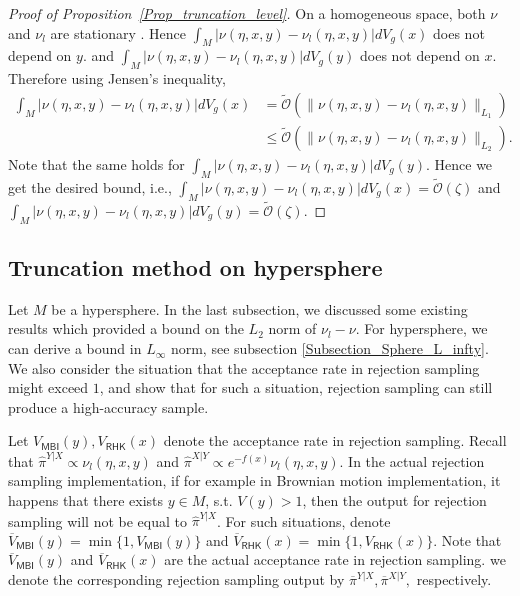 \begin{proof}[Proof of Proposition~\ref{Prop_truncation_level}]
    On a homogeneous space, both $\nu$ and $\nu_{l}$ are stationary \citep{azangulov2022stationary}.
    Hence $\int_{M} |\nu(\eta, x, y) - \nu_{l}(\eta, x, y) | dV_{g}(x) $ does not depend on $y$.
    and $\int_{M} |\nu(\eta, x, y) - \nu_{l}(\eta, x, y) | dV_{g}(y)$ does not depend on $x$.
    Therefore using Jensen's inequality, 
    \begin{align*}
        \int_{M} |\nu(\eta, x, y) - \nu_{l}(\eta, x, y) | dV_{g}(x) 
           & = \tilde{\mathcal{O}} (\|\nu(\eta, x, y) - \nu_{l}(\eta, x, y)\|_{L_{1}})\\
            &\le \tilde{\mathcal{O}} (\|\nu(\eta, x, y) - \nu_{l}(\eta, x, y)\|_{L_{2}}).
    \end{align*}
    Note that the same holds for $\int_{M} |\nu(\eta, x, y) - \nu_{l}(\eta, x, y) | dV_{g}(y)$.
    Hence we get the desired bound, i.e., 
    $\int_{M} |\nu(\eta, x, y) - \nu_{l}(\eta, x, y)| dV_{g}(x) = \tilde{\mathcal{O}}(\zeta)$ 
    and $\int_{M} |\nu(\eta, x, y) - \nu_{l}(\eta, x, y)| dV_{g}(y) = \tilde{\mathcal{O}}(\zeta)$.
\end{proof}

\subsection{Truncation method on hypersphere}\label{Subsection_inexact_rej}

Let $M$ be a hypersphere. 
In the last subsection, we discussed some existing results which provided a bound on the $L_{2}$ norm of $\nu_{l} - \nu$. For hypersphere, we can derive a bound in $L_{\infty}$ norm, see subsection \ref{Subsection_Sphere_L_infty}. We also consider the situation that the acceptance rate in rejection sampling might exceed $1$, and show that for such a situation, rejection sampling can still produce a high-accuracy sample. 

Let $V_{\mathsf{MBI}}(y), V_{\mathsf{RHK}}(x)$ denote the acceptance rate in rejection sampling.
Recall that $\hat{\pi}^{Y|X} \propto \nu_{l}(\eta, x, y)$ 
and $ \hat{\pi}^{X|Y} \propto e^{-f(x)}\nu_{l}(\eta, x, y) $. In the actual rejection sampling implementation, if for example in Brownian motion implementation, it happens that there exists $y \in M$, s.t. $V(y) > 1$, then the output for rejection sampling will not be equal to $\hat{\pi}^{Y|X}$. 
For such situations, denote $\overline{V}_{\mathsf{MBI}}(y) = \min\{1, V_{\mathsf{MBI}}(y)\}$ and $\overline{V}_{\mathsf{RHK}}(x) = \min\{1, V_{\mathsf{RHK}}(x)\}$. Note that $\overline{V}_{\mathsf{MBI}}(y)$ and $\overline{V}_{\mathsf{RHK}}(x)$ are the actual acceptance rate in rejection sampling.
we denote the corresponding rejection sampling output by $\overline{\pi}^{Y|X}, \overline{\pi}^{X|Y}, $ respectively.

